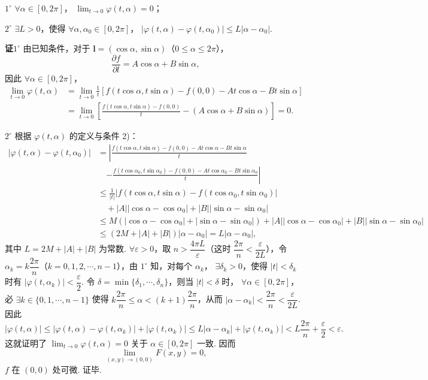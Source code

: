 \documentclass[UTF8,12pt,a4paper,fontset=fandol]{ctexart}
\begin{document}
$1^\circ$ $\forall\alpha\in[0,2\pi]$，
$\lim_{t\to0}\varphi(t,\alpha)=0$；

$2^\circ$ $\exists L>0$，使得 $\forall\alpha,\alpha_0\in[0,2\pi]$，
$|\varphi(t,\alpha)-\varphi(t,\alpha_0)|\le L|\alpha-\alpha_0|$.

\noindent\textbf{证}\quad $1^\circ$ 由已知条件，对于
$\mathbf l=(\cos\alpha,\sin\alpha)$（$0\le\alpha\le2\pi$），
\[
  \frac{\partial f}{\partial l}=A\cos\alpha+B\sin\alpha,
\]
因此 $\forall\alpha\in[0,2\pi]$，
\[
\begin{aligned}
  \lim_{t\to0}\varphi(t,\alpha)
  &=
  \lim_{t\to0}\frac1t
  [f(t\cos\alpha,t\sin\alpha)-f(0,0)-At\cos\alpha-Bt\sin\alpha]\\
  &=
  \lim_{t\to0}\left[
  \frac{f(t\cos\alpha,t\sin\alpha)-f(0,0)}{t}
  -(A\cos\alpha+B\sin\alpha)
  \right]=0.
\end{aligned}
\]

$2^\circ$ 根据 $\varphi(t,\alpha)$ 的定义与条件 2)：
\[
\begin{aligned}
|\varphi(t,\alpha)-\varphi(t,\alpha_0)|
&=
\left|
\frac{f(t\cos\alpha,t\sin\alpha)-f(0,0)-At\cos\alpha-Bt\sin\alpha}{t}
\right.\\
&\quad\left.
-
\frac{f(t\cos\alpha_0,t\sin\alpha_0)-f(0,0)-At\cos\alpha_0-Bt\sin\alpha_0}{t}
\right|\\
&\le
\frac1{|t|}
|f(t\cos\alpha,t\sin\alpha)-f(t\cos\alpha_0,t\sin\alpha_0)|\\
&\quad
 +|A||\cos\alpha-\cos\alpha_0|+|B||\sin\alpha-\sin\alpha_0|\\
&\le
M(|\cos\alpha-\cos\alpha_0|+|\sin\alpha-\sin\alpha_0|)
 +|A||\cos\alpha-\cos\alpha_0|+|B||\sin\alpha-\sin\alpha_0|\\
&\le (2M+|A|+|B|)|\alpha-\alpha_0|
=L|\alpha-\alpha_0|,
\end{aligned}
\]
其中 $L=2M+|A|+|B|$ 为常数. $\forall\varepsilon>0$，取
$n>\dfrac{4\pi L}{\varepsilon}$（这时 $\dfrac{2\pi}{n}<\dfrac{\varepsilon}{2L}$），令
$\alpha_k=k\dfrac{2\pi}{n}$（$k=0,1,2,\cdots,n-1$），由 $1^\circ$ 知，对每个 $\alpha_k$，
$\exists\delta_k>0$，使得 $|t|<\delta_k$ 时有
$|\varphi(t,\alpha_k)|<\dfrac\varepsilon2$. 令
$\delta=\min\{\delta_1,\cdots,\delta_n\}$，则当 $|t|<\delta$ 时，
$\forall\alpha\in[0,2\pi]$，必 $\exists k\in\{0,1,\cdots,n-1\}$ 使得
$k\dfrac{2\pi}{n}\le\alpha<(k+1)\dfrac{2\pi}{n}$，从而
$|\alpha-\alpha_k|<\dfrac{2\pi}{n}<\dfrac{\varepsilon}{2L}$. 因此
\[
  |\varphi(t,\alpha)|
  \le |\varphi(t,\alpha)-\varphi(t,\alpha_k)|+|\varphi(t,\alpha_k)|
  \le L|\alpha-\alpha_k|+|\varphi(t,\alpha_k)|
  <L\frac{2\pi}{n}+\frac\varepsilon2<\varepsilon.
\]
这就证明了 $\lim_{t\to0}\varphi(t,\alpha)=0$ 关于
$\alpha\in[0,2\pi]$ 一致. 因而
\[
  \lim_{(x,y)\to(0,0)}F(x,y)=0,
\]
$f$ 在 $(0,0)$ 处可微. 证毕.
\end{document}
